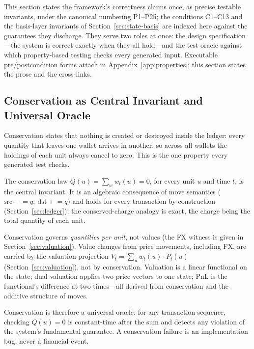 \documentclass[11pt,a4paper]{article}
\begin{document}
This section states the framework's correctness claims once, as precise testable invariants, under the canonical numbering P1--P25; the conditions C1--C13 and the basis-layer invariants of Section~\ref{sec:state-basis} are indexed here against the guarantees they discharge. They serve two roles at once: the design specification---the system is correct exactly when they all hold---and the test oracle against which property-based testing checks every generated input. Executable pre/postcondition forms attach in Appendix~\ref{app:properties}; this section states the prose and the cross-links.

\subsection{Conservation as Central Invariant and Universal Oracle}
\label{sec:invariants-conservation}

Conservation states that nothing is created or destroyed inside the ledger: every quantity that leaves one wallet arrives in another, so across all wallets the holdings of each unit always cancel to zero. This is the one property every generated test checks.

The conservation law $Q(u)=\sum_w w_t(u)=0$, for every unit $u$ and time $t$, is the central invariant. It is an algebraic consequence of move semantics ($\mathrm{src}\mathrel{-}=q;\ \mathrm{dst}\mathrel{+}=q$) and holds for every transaction by construction (Section~\ref{sec:ledger}); the conserved-charge analogy is exact, the charge being the total quantity of each unit.

Conservation governs \emph{quantities per unit}, not values (the FX witness is given in Section~\ref{sec:valuation}). Value changes from price movements, including FX, are carried by the valuation projection $V_t=\sum_u w_t(u)\cdot P_t(u)$ (Section~\ref{sec:valuation}), not by conservation. Valuation is a linear functional on the state; dual valuation applies two price vectors to one state; PnL is the functional's difference at two times---all derived from conservation and the additive structure of moves.

Conservation is therefore a universal oracle: for any transaction sequence, checking $Q(u)=0$ is constant-time after the sum and detects any violation of the system's fundamental guarantee. A conservation failure is an implementation bug, never a financial event.

\end{document}
